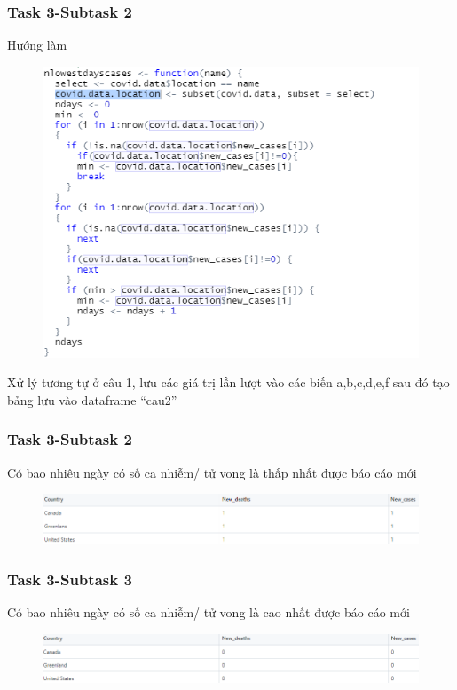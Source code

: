 \documentclass[english,10pt,table]{beamer}
\begin{document}
\frame
{
    \frametitle{Task 3-Subtask 2}
    \begin{block}{Hướng làm}

                \begin{figure}[H]
			\centering
			\includegraphics[scale=0.5]{images/3.0.4.png}
		\end{figure}
 Xử lý tương tự ở câu 1, lưu các giá trị lần lượt vào các biến a,b,c,d,e,f sau đó tạo bảng lưu vào dataframe “cau2”

    \end{block}
}
\frame
{
    \frametitle{Task 3-Subtask 2}
    \begin{block}{Có bao nhiêu ngày có số ca nhiễm/ tử vong là thấp nhất được báo cáo mới}
    \begin{figure}[H]
		\centering
		\includegraphics[scale=0.4]{images/3.2.png}
	\end{figure}
    \end{block}
}
\frame
{
    \frametitle{Task 3-Subtask 3}
    \begin{block}{Có bao nhiêu ngày có số ca nhiễm/ tử vong là cao nhất được báo cáo mới}
	\begin{figure}[H]
		\centering
		\includegraphics[scale=0.4]{images/3.3.png}
	\end{figure}
    \end{block}
}
\end{document}
